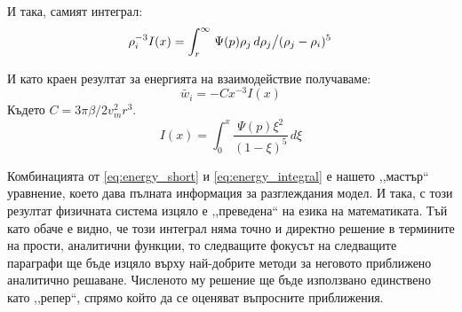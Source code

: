 И така, самият интеграл:
\begin{equation*}
    \rho_{i}^{-3} I(x) = \displaystyle\int_{r}^{\infty} \left. \Psi(p)\rho_j \,d\rho_j \middle/ (\rho_j-\rho_i)^5 \right.
\end{equation*}

И като краен резултат за енергията на взаимодействие получаваме:
\begin{equation}
    \tilde{w_i} = -C x^{-3} I(x) 
    \label{eq:energy_short}
\end{equation}
Където $ C = 3 \pi \beta / 2 v_{m}^2 r^3 $.
\begin{equation}
    I(x) = \displaystyle\int_{0}^{x} \frac{\Psi(p) \xi^2}{(1-\xi)^5}  \,d\xi
    \label{eq:energy_integral}
\end{equation}

Комбинацията от \autoref{eq:energy_short} и \autoref{eq:energy_integral} е нашето ,,мастър`` уравнение, което дава пълната информация за разглеждания модел.
И така, с този резултат физичната система изцяло е ,,преведена`` на езика на математиката. Тъй като обаче е видно, че този интеграл няма точно и директно решение в термините на прости, 
аналитични функции, то следващите фокусът на следващите параграфи ще бъде изцяло върху най-добрите методи за неговото приближено аналитично решаване. Численото му решение ще бъде използвано
единствено като ,,репер``, спрямо който да се оценяват въпросните приближения.
